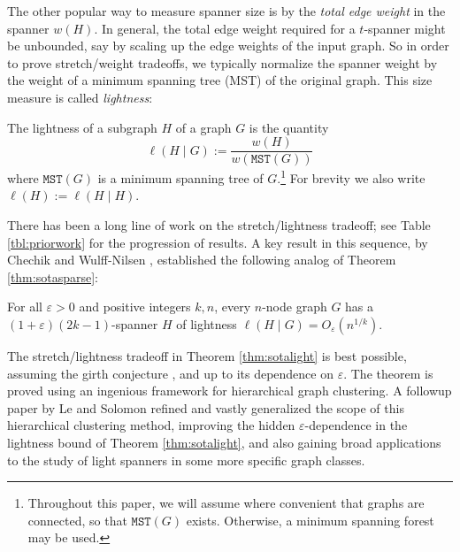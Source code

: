 \documentclass{theoretics}
\newcommand{\eps}{\varepsilon}
\newcommand{\mst}{\texttt{MST}}
\begin{document}
The other popular way to measure spanner size is by the \emph{total edge weight} in the spanner $w(H)$.
In general, the total edge weight required for a $t$-spanner might be unbounded, say by scaling up the edge weights of the input graph.
So in order to prove stretch/weight tradeoffs, we typically normalize the spanner weight by the weight of a minimum spanning tree (MST) of the original graph.
This size measure is called \emph{lightness}:
\begin{definition} 
The lightness of a subgraph $H$ of a graph $G$ is the quantity
$$\ell(H \mid G) := \frac{w(H)}{w(\mst(G))}$$
where $\mst(G)$ is a minimum spanning tree of $G$.\footnote{Throughout this paper, we will assume where convenient that graphs are connected, so that $\mst(G)$ exists.  Otherwise, a minimum spanning forest may be used.}
For brevity we also write $\ell(H) := \ell(H \mid H)$.
\end{definition}

There has been a long line of work on the stretch/lightness tradeoff; see Table \ref{tbl:priorwork} for the progression of results.
A key result in this sequence, by Chechik and Wulff-Nilsen \cite{CW18}, established the following analog of Theorem \ref{thm:sotasparse}:

\begin{theorem} [\cite{CW18}] \label{thm:sotalight}
For all $\eps>0$ and positive integers $k, n$, every $n$-node graph $G$ has a $(1+\eps)(2k-1)$-spanner $H$ of lightness
$\ell(H \mid G) = O_{\eps}\left( n^{1/k} \right).$
\end{theorem}

The stretch/lightness tradeoff in Theorem \ref{thm:sotalight} is best possible, assuming the girth conjecture \cite{girth}, and up to its dependence on $\eps$.
The theorem is proved using an ingenious framework for hierarchical graph clustering.
A followup paper by Le and Solomon \cite{LS23} refined and vastly generalized the scope of this hierarchical clustering method, improving the hidden $\eps$-dependence in the lightness bound of Theorem \ref{thm:sotalight}, and also gaining broad applications to the study of light spanners in some more specific graph classes.
\end{document}
